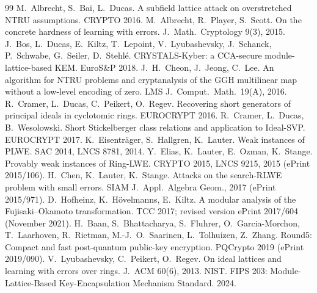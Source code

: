 \documentclass[11pt]{article}
\theoremstyle{remark}
\begin{document}
\begin{thebibliography}{99}
 M.~Albrecht, S.~Bai, L.~Ducas. A subfield lattice attack on overstretched NTRU assumptions. CRYPTO 2016.
 M.~Albrecht, R.~Player, S.~Scott. On the concrete hardness of learning with errors. J.\ Math.\ Cryptology 9(3), 2015.
 J.~Bos, L.~Ducas, E.~Kiltz, T.~Lepoint, V.~Lyubashevsky, J.~Schanck, P.~Schwabe, G.~Seiler, D.~Stehl\'e. CRYSTALS-Kyber: a CCA-secure module-lattice-based KEM. EuroS\&P 2018.
 J.~H.~Cheon, J.~Jeong, C.~Lee. An algorithm for NTRU problems and cryptanalysis of the GGH multilinear map without a low-level encoding of zero. LMS J.\ Comput.\ Math.\ 19(A), 2016.
 R.~Cramer, L.~Ducas, C.~Peikert, O.~Regev. Recovering short generators of principal ideals in cyclotomic rings. EUROCRYPT 2016.
 R.~Cramer, L.~Ducas, B.~Wesolowski. Short Stickelberger class relations and application to Ideal-SVP. EUROCRYPT 2017.
 K.~Eisentr\"ager, S.~Hallgren, K.~Lauter. Weak instances of PLWE. SAC 2014, LNCS 8781, 2014.
 Y.~Elias, K.~Lauter, E.~Ozman, K.~Stange. Provably weak instances of Ring-LWE. CRYPTO 2015, LNCS 9215, 2015 (ePrint 2015/106).
 H.~Chen, K.~Lauter, K.~Stange. Attacks on the search-RLWE problem with small errors. SIAM J.\ Appl.\ Algebra Geom., 2017 (ePrint 2015/971).
 D.~Hofheinz, K.~H\"ovelmanns, E.~Kiltz. A modular analysis of the Fujisaki--Okamoto transformation. TCC 2017; revised version ePrint 2017/604 (November 2021).
 H.~Baan, S.~Bhattacharya, S.~Fluhrer, O.~Garcia-Morchon, T.~Laarhoven, R.~Rietman, M.-J.~O.~Saarinen, L.~Tolhuizen, Z.~Zhang. Round5: Compact and fast post-quantum public-key encryption. PQCrypto 2019 (ePrint 2019/090).
 V.~Lyubashevsky, C.~Peikert, O.~Regev. On ideal lattices and learning with errors over rings. J.\ ACM 60(6), 2013.
 NIST. FIPS 203: Module-Lattice-Based Key-Encapsulation Mechanism Standard. 2024.
\end{thebibliography}
\end{document}
